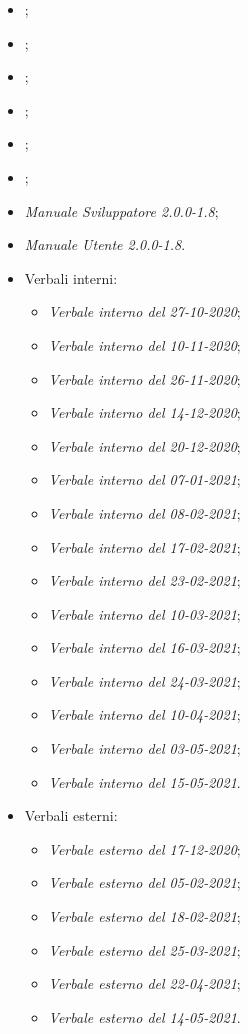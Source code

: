 \documentclass[11pt]{letter}
\begin{document}
\begin{letter}
\begin{itemize}
        	\item {};
            \item {};
            \item {};
            \item {};
            \item {};
            \item {};
            \item \textit{Manuale Sviluppatore 2.0.0-1.8};
            \item \textit{Manuale Utente 2.0.0-1.8}.
            \item Verbali interni:
            \begin{itemize}
            	\item \textit{Verbale interno del 27-10-2020};
            	\item \textit{Verbale interno del 10-11-2020};
            	\item \textit{Verbale interno del 26-11-2020};
            	\item \textit{Verbale interno del 14-12-2020};
           	 	\item \textit{Verbale interno del 20-12-2020};
            	\item \textit{Verbale interno del 07-01-2021};
            	\item \textit{Verbale interno del 08-02-2021};
            	\item \textit{Verbale interno del 17-02-2021};
            	\item \textit{Verbale interno del 23-02-2021};
            	\item \textit{Verbale interno del 10-03-2021};
           	 	\item \textit{Verbale interno del 16-03-2021};
            	\item \textit{Verbale interno del 24-03-2021};
            	\item \textit{Verbale interno del 10-04-2021};
            	\item \textit{Verbale interno del 03-05-2021};
            	\item \textit{Verbale interno del 15-05-2021}.
            \end{itemize}
            \item Verbali esterni:
            \begin{itemize}
            	\item \textit{Verbale esterno del 17-12-2020};
            	\item \textit{Verbale esterno del 05-02-2021};
            	\item \textit{Verbale esterno del 18-02-2021};
            	\item \textit{Verbale esterno del 25-03-2021};
            	\item \textit{Verbale esterno del 22-04-2021};
            	\item \textit{Verbale esterno del 14-05-2021}.
            	

\end{itemize}
\end{itemize}
\end{letter}
\end{document}
